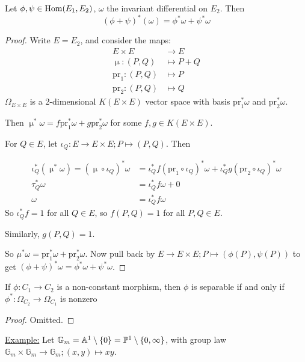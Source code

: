 \documentclass[10pt,a4paper]{article}
\begin{document}
\begin{lemma}
  Let $\phi, \psi \in \operatorname{Hom}(E_1, E_2)$, $\omega$ the invariant differential on $E_2$. Then \[(\phi+\psi)^{\ast}(\omega) = \phi^{\ast}\omega + \psi^{\ast}\omega\]
\end{lemma}
\begin{proof}
  Write $E=E_2$, and consider the maps:
  \begin{align*}
    E\times E &\to E\\
    \upmu:(P, Q) &\mapsto P+Q\\
    \text{pr}_1:(P,Q) &\mapsto P\\
    \text{pr}_2:(P,Q) &\mapsto Q
  \end{align*}
  $\Omega_{E\times E}$ is a 2-dimensional $K(E\times E)$ vector space with basis $\text{pr}_1^\ast \omega$ and $\text{pr}_2^\ast \omega$.

  Then $\upmu^\ast \omega = f \text{pr}_1^\ast \omega + g\text{pr}_2^\ast \omega$ for some $f, g \in K(E\times E)$.

  For $Q \in E$, let $\iota_Q : E \to E\times E; P \mapsto (P, Q)$. Then

  \begin{align*}
    \iota_Q^\ast(\upmu^\ast \omega) = (\upmu\circ\iota_Q)^\ast \omega &= \iota_Q^\ast f(\text{pr}_1\circ \iota_Q)^\ast\omega + \iota_Q^\ast g (\text{pr}_2\circ \iota_Q)^\ast \omega\\
    \tau_Q^\ast \omega &= \iota_Q^\ast f \omega + 0\\
    \omega &= \iota_Q^\ast f \omega
  \end{align*}
  So $\iota_Q^\ast f = 1$ for all $Q \in E$, so $f(P,Q) = 1$ for all $P, Q \in E$.

  Similarly, $g(P,Q) = 1$.

  So $\mu^{\ast} \omega= \text{pr}_1^\ast \omega + \text{pr}_2^\ast \omega$. Now pull back by $E\to E\times E; P \mapsto (\phi(P), \psi(P))$ to get $(\phi+\psi)^\ast \omega=  \phi^\ast \omega + \psi^\ast \omega$.
\end{proof}
\begin{lemma}
  If $\phi:C_1 \to C_2$ is a non-constant morphism, then $\phi$ is separable if and only if $\phi^\ast:\Omega_{C_2}\to \Omega_{C_1}$ is nonzero
\end{lemma}
\begin{proof}
  Omitted.
\end{proof}
\underline{Example:} Let $\mathbb{G}_m = \mathbb{A}^1\setminus\{0\} = \mathbb{P}^1\setminus\{0, \infty\}$, with group law $\mathbb{G}_m \times \mathbb{G}_m \to \mathbb{G}_m; (x,y)\mapsto xy$.
\end{document}
